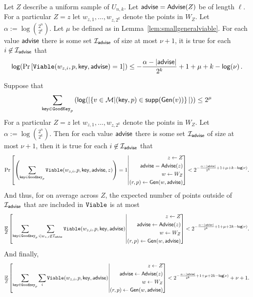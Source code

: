 \begin{lemma}
Let $Z$ describe a uniform sample of $U_{n,k}$.  Let ${\mathsf{advise}} = {\mathsf{Advise}}(Z)$ be of length $\ell$.
 For a particular $Z=z$ let $w_{z,1},..., w_{z,2^k}$ denote the points in $W_Z$. Let $\alpha:= \log {2^n\choose 2^k}$.  Let $\mu$ be defined as in Lemma~\ref{lem:smallgeneralviable}.  
For each value ${\mathsf{advise}}$ there is some set $\mathcal{I}_{{\mathsf{advise}}}$ of size at most $\nu+1$, it is true for each $i\not \in \mathcal{I}_{\mathsf{advise}}$ that
\[
\mathsf{log}\!\left(\Pr\left[\mathtt{Viable}(w_{z,i}, p, \mathsf{key}, {\mathsf{advise}}) = 1 \right]\right)\le -\frac{\alpha -|{\mathsf{advise}}| }{2^k}+1+\mu+k-\mathsf{log}\!\left(\nu\right).
\]
\label{lem:entr of members}
\end{lemma}

\begin{corollary}
\label{corollary:info loss}
Suppose that 
\[
   \sum_{\mathsf{key}\in \mathtt{GoodKey}_p} \left( \mathsf{log}\!\left(|\!\left\{ v \in \mathcal{M}|\!\left(\mathsf{key}, p\right) \in \mathsf{supp}\!\left(\mathsf{Gen}(v)\right) \right\}|\right)\right) \le 2^\mu 
 \]
 For a particular $Z=z$ let $w_{z,1},..., w_{z,2^k}$ denote the points in $W_Z$. Let $\alpha:= \log {2^n\choose 2^k}$.  
 Then for each value ${\mathsf{advise}}$ there is some set $\mathcal{I}_{{\mathsf{advise}}}$ of size at most $\nu+1$, then it is true for each $i\not \in \mathcal{I}_{\mathsf{advise}}$ that
\[
\Pr\left[\left(\sum_{\mathsf{key} \in \mathtt{Goodkey}_p} \mathtt{Viable}(w_{z,i}, p, \mathsf{key}, {\mathsf{advise}}, z)\right) = 1\middle| \begin{aligned} z\leftarrow Z\\ {\mathsf{advise}}= {\mathsf{Advise}}(z)\\w\leftarrow W_Z\\(r, p)\leftarrow {\ensuremath{\mathsf{Gen}}}(w, {\mathsf{advise}}) \end{aligned} \right]< 2^{-\frac{\alpha-|{\mathsf{advise}}|}{2^k}+1+\mu+k-\mathsf{log}\!\left(\nu\right) }.
\]
And thus, for on average across $Z$, the expected number of points outside of $\mathcal{I}_{\mathsf{advise}}$ that are included in $\mathtt{Viable}$ is at most 
\begin{align*}
\operatorname*{\mathbb{E}}_{Z} \left[\sum_{\mathsf{key} \in \mathtt{Goodkey}_p}\sum_{i | w_{z,i}\not\in\mathcal{I}_{\mathsf{advise}}} \mathtt{Viable}(w_{z,i}, p, \mathsf{key}, {\mathsf{advise}}) \middle| \begin{aligned} z\leftarrow Z\\ {\mathsf{advise}}\leftarrow {\ensuremath{\mathsf{Advise}}}(z)\\w\leftarrow W_Z\\(r, p)\leftarrow {\ensuremath{\mathsf{Gen}}}(w, {\mathsf{advise}})\end{aligned} \right]< 2^{-\frac{\alpha - |{\mathsf{advise}}|}{2^k}+1+\mu+2k-\mathsf{log}\!\left(\nu\right)}.
\end{align*}
And finally, 
\begin{align*}
\operatorname*{\mathbb{E}}_{Z} \left[\sum_{\mathsf{key} \in \mathtt{Goodkey}_p}\sum_{i }  \mathtt{Viable}(w_{z,i}, p, \mathsf{key}, {\mathsf{advise}}) \middle| \begin{aligned} z\leftarrow Z\\ {\mathsf{advise}}\leftarrow {\ensuremath{\mathsf{Advise}}}(z)\\w\leftarrow W_Z\\(r, p)\leftarrow {\ensuremath{\mathsf{Gen}}}(w, {\mathsf{advise}})\end{aligned} \right]< 2^{-\frac{\alpha-|{\mathsf{advise}}|}{2^k}+1+\mu+2k-\mathsf{log}\!\left(\nu\right)}+\nu+1.
\end{align*}

\end{corollary}

